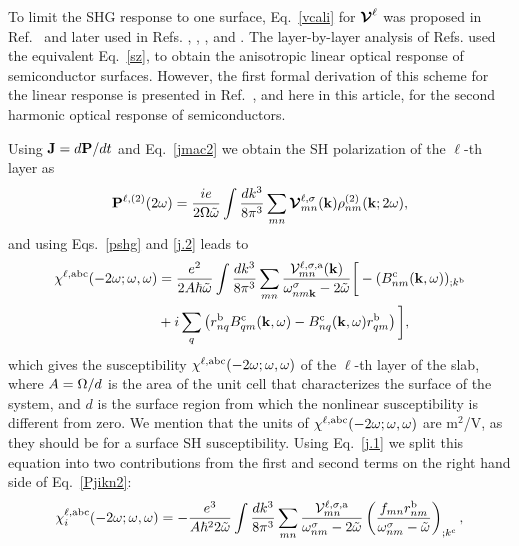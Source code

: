 \documentclass[floatfix,prb,aps,superscriptaddress,11pt,preprint,letterpaper]{revtex4}
\def\chon{red}
\begin{document}
To limit the SHG response to one surface, Eq.~\eqref{vcali} 
for $\boldsymbol{\mathcal{\cal V}}^\ell$ was proposed in 
Ref.~ and later used in Refs.
,
,
,
 and . 
The layer-by-layer analysis of Refs.  
used the equivalent Eq.~\eqref{sz}, 
to obtain the
anisotropic linear optical response of semiconductor surfaces.
However, the first formal derivation
of this scheme 
for the linear response 
is presented in
Ref.~, 
and here in this 
article, for the second harmonic optical response of semiconductors.

Using
$\mathbf{J}=d\mathbf{P}/dt$ 
and Eq.~\eqref{jmac2} 
we obtain the SH polarization of the $\ell$-th layer as
\begin{equation}\label{Pjikn}
\mathbf{P}^{\ell,(2)}(2\omega)
=\frac{ie}{2\Omega\tilde\omega}
\int \frac{dk^3}{8\pi^3}
\sum_{mn}
\boldsymbol{\mathcal{\cal V}}^{\ell,\sigma}_{mn}(\mathbf{k})
\rho^{(2)}_{nm}(\mathbf{k};2\omega)
,
\end{equation}
and using Eqs.~\eqref{pshg} and \eqref{j.2} 
leads to
\begin{align}\label{Pjikn2}
\chi^{\ell,\mathrm{a}\mathrm{b}\mathrm{c}}(-2\omega;\omega,\omega) 
&=
\frac{e^2}{2A\hbar\tilde\omega}
\int \frac{dk^3}{8\pi^3}
\sum_{mn}
\frac{{\mathbf{\cal V}}^{\ell,\sigma,\mathrm{a}}_{mn}(\mathbf{k})}
{\omega^\sigma_{nm\mathbf{k}}-2\tilde\omega}
\bigg[
-(B_{nm}^{\mathrm{c}}(\mathbf{k},\omega))_{;k^{\mathrm{b}}}
\nonumber \\
&
+i\sum_q\left(r_{nq}^{\mathrm{b}}B_{qm}^{\mathrm{c}}(\mathbf{k},\omega) -
  B_{nq}^{\mathrm{c}}(\mathbf{k},\omega) 
  r_{qm}^{\mathrm{b}}\right)
\bigg]
,
\end{align}
which gives the susceptibility 
$\chi^{\ell,\mathrm{a}\mathrm{b}\mathrm{c}}(-2\omega;\omega,\omega)$ 
of the $\ell$-th layer of the slab, 
where $A=\Omega/d$ is the area of the unit
cell that characterizes the surface of the system, and $d$
is the surface region {\color{\chon} from} which the {\color{\chon} nonlinear} 
susceptibility is different from zero.
We mention that the units of 
$\chi^{\ell,\mathrm{a}\mathrm{b}\mathrm{c}}(-2\omega;\omega,\omega)$
are m$^2$/V, as they {\color{\chon} should be} for a surface SH susceptibility.
Using Eq.~\eqref{j.1} we
split this equation into
two contributions from the first and second terms on the right hand side
{\color{\chon} of Eq.~\eqref{Pjikn2}:}
\begin{equation}\label{chii}
\chi^{\ell,\mathrm{a}\mathrm{b}\mathrm{c}}_i (-2\omega;\omega,\omega)
=-\frac{e^3}{A\hbar^22\tilde\omega}
\int \frac{dk^3}{8\pi^3}
\sum_{mn}
\frac{{\mathbf{\cal V}}_{mn}^{\ell,\sigma,\mathrm{a}}}{\omega^\sigma_{nm}-2\tilde\omega}
\left(\frac{f_{mn}r_{nm}^{\mathrm{b}}}{\omega^\sigma_{nm}-\tilde\omega}\right)_{;k^{\mathrm{c}}}
,
\end{equation} 
\end{document}
